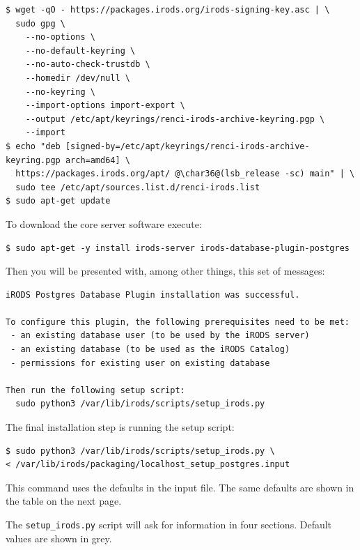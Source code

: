 \documentclass[10pt,oneside]{memoir}
\begin{document}
\begin{lstlisting}
$ wget -qO - https://packages.irods.org/irods-signing-key.asc | \
  sudo gpg \
    --no-options \
    --no-default-keyring \
    --no-auto-check-trustdb \
    --homedir /dev/null \
    --no-keyring \
    --import-options import-export \
    --output /etc/apt/keyrings/renci-irods-archive-keyring.pgp \
    --import
$ echo "deb [signed-by=/etc/apt/keyrings/renci-irods-archive-keyring.pgp arch=amd64] \
  https://packages.irods.org/apt/ @\char36@(lsb_release -sc) main" | \
  sudo tee /etc/apt/sources.list.d/renci-irods.list
$ sudo apt-get update
\end{lstlisting}

To download the core server software execute:

\begin{lstlisting}
$ sudo apt-get -y install irods-server irods-database-plugin-postgres
\end{lstlisting}

Then you will be presented with, among other things, this set of messages:

\begin{lstlisting}
iRODS Postgres Database Plugin installation was successful.

To configure this plugin, the following prerequisites need to be met:
 - an existing database user (to be used by the iRODS server)
 - an existing database (to be used as the iRODS Catalog)
 - permissions for existing user on existing database

Then run the following setup script:
  sudo python3 /var/lib/irods/scripts/setup_irods.py
\end{lstlisting}

The final installation step is running the setup script:

\begin{lstlisting}
$ sudo python3 /var/lib/irods/scripts/setup_irods.py \
< /var/lib/irods/packaging/localhost_setup_postgres.input
\end{lstlisting}

This command uses the defaults in the input file.  The same defaults are shown in the table on the next page.

\newpage
The \texttt{setup\_irods.py} script will ask for information in four sections.  Default values are shown in grey.
\end{document}
